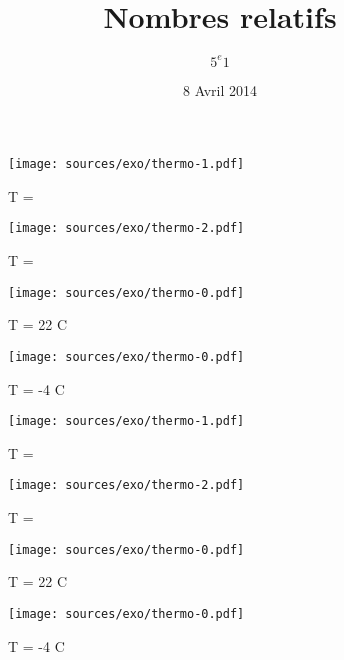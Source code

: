 \documentclass[11pt]{article}
\title{Nombres relatifs} %
\author{$5^e 1$}
\date{8 Avril 2014} %
\begin{document}

\thispagestyle{empty}

\setlength{\columnseprule}{1pt}
\begin{multicols}{4}

  \begin{figure}[H]
    \centering
    \texttt{[image: sources/exo/thermo-1.pdf]}
    \caption{T = }
  \end{figure}

  \begin{figure}[H]
    \centering
    \texttt{[image: sources/exo/thermo-2.pdf]}
    \caption{T = }
  \end{figure}

  \begin{figure}[H]
    \centering
    \texttt{[image: sources/exo/thermo-0.pdf]}
    \caption{T = 22  C}  
  \end{figure}

  \begin{figure}[H]
    \centering
    \texttt{[image: sources/exo/thermo-0.pdf]}
    \caption{T = -4  C}  
  \end{figure}
\end{multicols}

\begin{multicols}{4}
  \begin{figure}[H]
    \centering
    \texttt{[image: sources/exo/thermo-1.pdf]}
    \caption{T = }
  \end{figure}

  \begin{figure}[H]
    \centering
    \texttt{[image: sources/exo/thermo-2.pdf]}
    \caption{T = }
  \end{figure}

  \begin{figure}[H]
    \centering
    \texttt{[image: sources/exo/thermo-0.pdf]}
    \caption{T = 22  C}  
  \end{figure}

  \begin{figure}[H]
    \centering
    \texttt{[image: sources/exo/thermo-0.pdf]}
    \caption{T = -4  C}  
  \end{figure}
\end{multicols}
\end{document}
